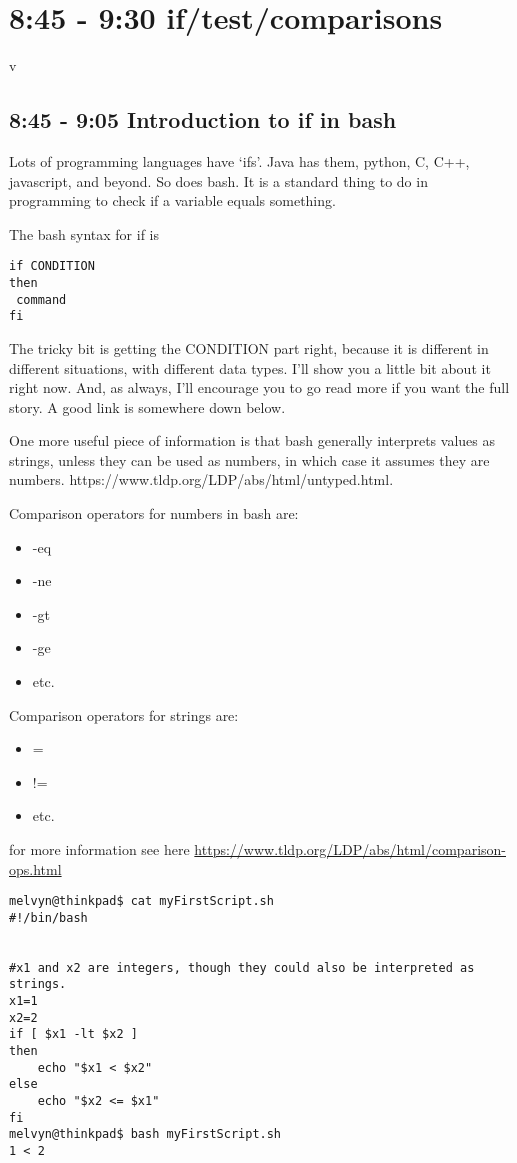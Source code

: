 \documentclass[12pt,a4paper]{article}
\begin{document}
\section{ 8:45 - 9:30 if/test/comparisons}
v\subsection{8:45 - 9:05 Introduction to if in bash}
Lots of programming languages have `ifs'. Java has them, python, C, C++,
javascript, and beyond. So does bash. It is a standard thing to do in
programming to check if a variable equals something.

The bash syntax for if is 

\begin{verbatim}
if CONDITION
then
 command
fi
\end{verbatim}

The tricky bit is getting the CONDITION part right, because it is different in
different situations, with different data types. I'll show you a little bit
about it right now. And, as always, I'll encourage you to go read more if you
want the full story. A good link is somewhere down below.

One more useful piece of information is that bash generally interprets values as strings, unless they can be used as numbers, in which case it assumes they are numbers. https://www.tldp.org/LDP/abs/html/untyped.html.

Comparison operators for numbers in bash are:

\begin{itemize}
\item -eq
\item -ne
\item -gt
\item -ge 
\item etc.
\end{itemize}

Comparison operators for strings are:

\begin{itemize}
\item =
\item !=
\item etc.
\end{itemize}

for more information see here
\url{https://www.tldp.org/LDP/abs/html/comparison-ops.html}


\begin{lstlisting}[style=term]
melvyn@thinkpad$ cat myFirstScript.sh
#!/bin/bash


#x1 and x2 are integers, though they could also be interpreted as strings.
x1=1
x2=2
if [ $x1 -lt $x2 ]        
then
    echo "$x1 < $x2"
else
    echo "$x2 <= $x1"
fi
melvyn@thinkpad$ bash myFirstScript.sh
1 < 2
\end{lstlisting}
\end{document}
